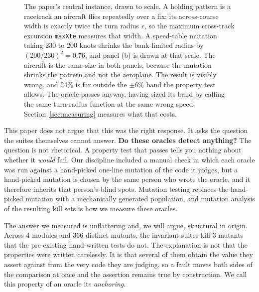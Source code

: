 \documentclass[12pt]{article}
\begin{document}
\begin{figure}[t]
\caption{The paper's central instance, drawn to scale. A holding pattern is a
racetrack an aircraft flies repeatedly over a fix; its across-course width is
exactly twice the turn radius $r$, so the maximum cross-track excursion
\texttt{maxXte} measures that width. A speed-table mutation taking 230 to 200
knots shrinks the bank-limited radius by $(200/230)^2 = 0.76$, and panel (b) is
drawn at that scale. The aircraft is the same size in both panels, because the
mutation shrinks the pattern and not the aeroplane. The result is visibly wrong,
and 24\% is far outside the $\pm 6\%$ band the property test allows.
The oracle passes anyway, having sized its band by calling the same turn-radius
function at the same wrong speed. Section~\ref{sec:measuring} measures what that
costs.}
\label{fig:hold-geometry}
\end{figure}

This paper does not argue that this was the right response. It asks the question
the suites themselves cannot answer. \textbf{Do these oracles detect anything?}
The question is not rhetorical. A property test that passes tells you nothing
about whether it \emph{would} fail. Our discipline included a manual check in
which each oracle was run against a hand-picked one-line mutation of the code it
judges, but a hand-picked mutation is chosen by the same person who wrote the
oracle, and it therefore inherits that person's blind spots. Mutation testing
\cite{demillo1978,jia2011} replaces the hand-picked mutation with a mechanically
generated population, and mutation analysis of the resulting kill sets is how we
measure these oracles.

The answer we measured is unflattering and, we will argue, structural in origin. Across 4 modules and 366 distinct mutants, the invariant suites
kill 3 mutants that the pre-existing hand-written tests do not. The
explanation is not that the properties were written carelessly. It is that
several of them obtain the value they assert against from the very code they are
judging, so a fault moves both sides of the comparison at once and the assertion
remains true by construction. We call this property of an oracle its
\emph{anchoring}.
\end{document}
